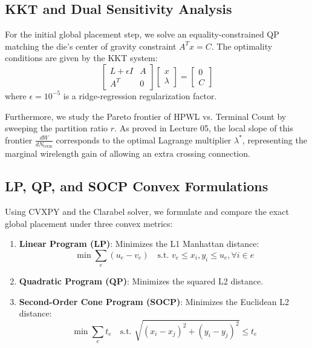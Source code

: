 \documentclass[10pt, twocolumn]{article}
\begin{document}
\subsection{KKT and Dual Sensitivity Analysis}
For the initial global placement step, we solve an equality-constrained QP matching the die's center of gravity constraint $A^T x = C$. The optimality conditions are given by the KKT system:
\begin{equation}
\begin{bmatrix} L + \epsilon I & A \\ A^T & 0 \end{bmatrix} \begin{bmatrix} x \\ \lambda \end{bmatrix} = \begin{bmatrix} 0 \\ C \end{bmatrix}
\end{equation}
where $\epsilon = 10^{-5}$ is a ridge-regression regularization factor. 

Furthermore, we study the Pareto frontier of HPWL vs. Terminal Count by sweeping the partition ratio $r$. As proved in Lecture 05, the local slope of this frontier $\frac{d W}{d N_{\text{term}}}$ corresponds to the optimal Lagrange multiplier $\lambda^*$, representing the marginal wirelength gain of allowing an extra crossing connection.

\subsection{LP, QP, and SOCP Convex Formulations}
Using CVXPY and the Clarabel solver, we formulate and compare the exact global placement under three convex metrics:
\begin{enumerate}
\item \textbf{Linear Program (LP)}: Minimizes the L1 Manhattan distance:
\begin{equation}
\min \sum_{e} (u_e - v_e) \quad \text{s.t. } v_e \le x_i, y_i \le u_e, \forall i \in e
\end{equation}
\item \textbf{Quadratic Program (QP)}: Minimizes the squared L2 distance.
\item \textbf{Second-Order Cone Program (SOCP)}: Minimizes the Euclidean L2 distance:
\begin{equation}
\min \sum_{e} t_e \quad \text{s.t. } \sqrt{(x_i - x_j)^2 + (y_i - y_j)^2} \le t_e
\end{equation}
\end{enumerate}
\end{document}
